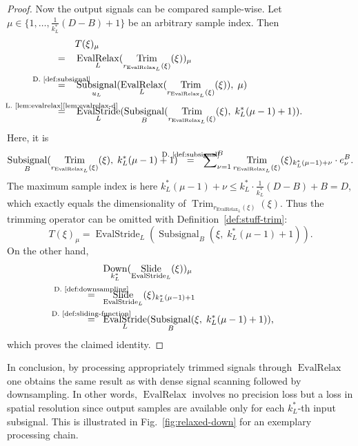 \documentclass[journal]{IEEEtran}
\newcommand{\ROI}{B}
\newcommand{\discint}[2]{\{#1,\dotsc,#2\}}
\newcommand{\inint}[2]{\in\discint{#1}{#2}}
\DeclareMathOperator{\Subsignal}{Subsignal}
\DeclareMathOperator{\Slide}{Slide}
\DeclareMathOperator{\EvalStride}{EvalStride}
\DeclareMathOperator{\Trimming}{Trim}
\newcommand{\equsing}[1]{\overset{\mathclap{\text{#1}}}{=}}
\DeclareMathOperator{\EvalRelax}{EvalRelax}
\DeclareMathOperator{\Downsampling}{Down}
\begin{document}
\begin{proof}
Now the output signals can be compared sample-wise.
Let $\mu\inint{1}{\frac{1}{k_L^*}(D - \ROI) + 1}$ be an arbitrary sample index.
Then
\begin{align*}
  & T(\xi)_\mu\\
  =\ \ \ & \EvalRelax_L(\Trimming_{r_{\EvalRelax_L}(\xi)}(\xi))_\mu\\
  \equsing{D.~\ref{def:subsignal}}\ \ \ & \Subsignal_{u_L}(\EvalRelax_L(\Trimming_{r_{\EvalRelax_L}(\xi)}(\xi)),\; \mu)\\
  \equsing{L.~\ref{lem:evalrelax}\ref{lem:evalrelax-d}}\ \ \ & \EvalStride_L(\Subsignal_\ROI(\Trimming_{r_{\EvalRelax_L}(\xi)}(\xi),\; k_L^*(\mu - 1) + 1))\text{.}
\end{align*}
Here, it is
\begin{displaymath}
  \Subsignal_\ROI(\Trimming_{r_{\EvalRelax_L}(\xi)}(\xi),\; k_L^*(\mu - 1) + 1) \ \ \equsing{D.~\ref{def:subsignal}}\ \  \sum\nolimits_{\nu = 1}^\ROI \Trimming_{r_{\EvalRelax_L}(\xi)}(\xi)_{k_L^*(\mu - 1) + \nu}\cdot e_\nu^{\ROI}\text{.}
\end{displaymath}
The maximum sample index is here $k_L^*(\mu - 1) + \nu \leq k_L^*\cdot\frac{1}{k_L^*}(D - \ROI) + \ROI = D$, which exactly equals the dimensionality of $\Trimming_{r_{\EvalRelax_L}(\xi)}(\xi)$.
Thus the trimming operator can be omitted with Definition~\ref{def:stuff-trim}:
\begin{displaymath}
  T(\xi)_\mu
  = \EvalStride_L(\Subsignal_\ROI(\xi,\; k_L^*(\mu - 1) + 1))\text{.}
\end{displaymath}
On the other hand,
\begin{align*}
  & \Downsampling_{k_L^*}(\Slide_{\EvalStride_L}(\xi))_\mu\\
  \equsing{D.~\ref{def:downsampling}}\ \ & \Slide_{\EvalStride_L}(\xi)_{k_L^*(\mu - 1) + 1}\\
  \equsing{D.~\ref{def:sliding-function}}\ \ & \EvalStride_L(\Subsignal_\ROI(\xi,\; k_L^*(\mu - 1) + 1))\text{,}
\end{align*}
which proves the claimed identity.
\end{proof}

In conclusion, by processing appropriately trimmed signals through $\EvalRelax$ one obtains the same result as with dense signal scanning followed by downsampling.
In other words, $\EvalRelax$ involves no precision loss but a loss in spatial resolution since output samples are available only for each $k_L^*$-th input subsignal.
This is illustrated in Fig.~\ref{fig:relaxed-down} for an exemplary processing chain.
\end{document}
